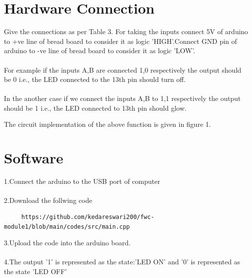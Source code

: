 \documentclass[10pt, a4paper]{article}
\begin{document}
   \section{Hardware Connection}
   
Give the connections as per Table 3. For taking the inputs connect 5V of arduino to +ve line of bread board to consider it as logic 'HIGH'.Connect GND pin of arduino to -ve line of bread board to consider it as logic 'LOW'.
\\
\\
For example if the inputs A,B are connected 1,0 respectively the output should be 0 i.e., the LED connected to the 13th pin should turn off.
\\
\\
In the another case if we connect the inputs A,B to 1,1 respectively the output should be 1 i.e., the LED connected to 13th pin should glow.

The circuit implementation of the above function is given in figure 1.








  \section{Software}
  1.Connect the arduino to the USB port of computer
  \\
  \\2.Download the follwing code
  \\
  \begin{lstlisting}
     https://github.com/kedareswari200/fwc-module1/blob/main/codes/src/main.cpp
  \end{lstlisting}
  
  3.Upload the code into the arduino board.
  \\
  \\
  4.The output '1' is represented as the state:'LED ON' and '0' is represented as the state 'LED OFF' 
\end{document}
